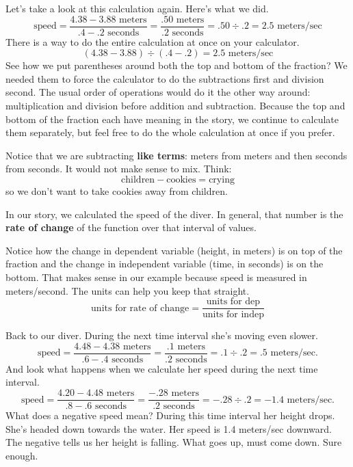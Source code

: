 Let's take a look at this calculation again.  Here's what we did.
$$\text{speed} =  \frac{4.38-3.88 \text{ meters}}{.4-.2 \text{ seconds}} = \frac{.50 \text{ meters}}{.2 \text{ seconds}} = .50 \div .2 = 2.5 \text{ meters/sec}$$
There is a way to do the entire calculation at once on your calculator.
$$(4.38-3.88) \div (.4-.2)=2.5 \text{ meters/sec}$$
See how we put parentheses around both the top and bottom of the fraction?  We needed them to force the calculator to do the subtractions first and division second. The usual order of operations would do it the other way around:  multiplication and division before addition and subtraction.  Because the top and bottom of the fraction each have meaning in the story, we continue to calculate them separately, but feel free to do the whole calculation at once if you prefer.

Notice that we are subtracting \textbf{like terms}:  meters from meters and then seconds from seconds.  It would not make sense to  mix.  Think:  $$\text{children} -  \text{cookies} = \text{crying}$$
so we don't want to take cookies away from children.

In our story, we calculated the speed of the diver.  In general, that number is the \textbf{rate of change} of the function over that interval of values.  

\bigskip
\bigskip

\noindent Notice how the change in dependent variable (height, in meters) is on top of the fraction and the change in independent variable (time, in seconds) is on the bottom.  That makes sense in our example because speed is measured in meters/second.  The units can help you keep that straight.
$$\text{units for rate of change} = \frac{\text{units for dep}}{\text{units for indep}}$$

Back to our diver.  During the next time interval she's moving even slower.  
$$\text{speed} = \frac{4.48-4.38 \text{ meters}}{.6-.4 \text{ seconds}}= \frac{.1 \text{ meters}}{.2 \text{ seconds}} = .1 \div .2 = .5 \text{ meters/sec.}$$  
And look what happens when we calculate her speed during the next time interval.  
$$\text{speed} = \frac{4.20-4.48 \text{ meters}}{.8-.6 \text{ seconds}} =  \frac{-.28 \text{ meters}}{.2 \text{ seconds}} = -.28 \div .2 = -1.4 \text{ meters/sec.}$$  What does a negative speed mean?  During this time interval her height drops.  She's headed down towards the water.  Her speed is 1.4 meters/sec downward.  The negative tells us her height is falling.  What goes up, must come down.  Sure enough.

